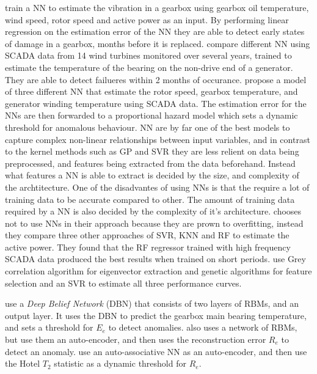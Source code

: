 \textcite{ANN_damage_detection_gearbox_wt} train a NN to estimate the vibration in a gearbox using gearbox oil temperature, wind speed, rotor speed and active power as an input. By performing linear regression on the estimation error of the NN they are able to detect early states of damage in a gearbox, months before it is replaced. \textcite{detecting_malfunctions_wt_generator_bearings_generic_vs_specific_models} compare different NN using SCADA data from 14 wind turbines monitored over several years, trained to estimate the temperature of the bearing on the non-drive end of a generator. They are able to detect failueres within 2 months of occurance. \textcite{health_cond_model_nn_proportional_hazard_models} propose a model of three different NN that estimate the rotor speed, gearbox temperature, and generator winding temperature using SCADA data. The estimation error for the NNs are then forwarded to a proportional hazard model which sets a dynamic threshold for anomalous behaviour. NN are by far one of the best models to capture complex non-linear relationships between input variables, and in contrast to the kernel methods such as GP and SVR they are less relient on data being preprocessed, and features being extracted from the data beforehand. Instead what features a NN is able to extract is decided by the size, and complexity of the archtitecture. One of the disadvantes of using NNs is that the require a lot of training data to be accurate compared to other. The amount of training data required by a NN is also decided by the complexity of it's architecture. \textcite{high_freq_scada_perf_monit_sensitivity} chooses not to use NNs in their approach because they are prown to overfitting, instead they compare three other approaches of SVR, KNN and RF to estimate the active power. They found that the RF regressor trained with high frequency SCADA data produced the best results when trained on short periods. \textcite{abnormal_detection_scada_data_mining} use Grey correlation algorithm for eigenvector extraction and genetic algorithms for feature selection and an SVR to estimate all three performance curves. \bigskip

\textcite{DBN_chicken_swarm_optim} use a \textit{Deep Belief Network} (DBN) that consists of two layers of RBMs, and an output layer. It uses the DBN to predict the gearbox main bearing temperature, and sets a threshold for $E_e$ to detect anomalies. \textcite{AD_and_fault_analysis_wt_DAE} also uses a network of RBMs, but use them an auto-encoder, and then uses the reconstruction error $R_e$ to detect an anomaly. \textcite{auto_associative_nn_wt_fault_detection} use an auto-associative NN as an auto-encoder, and then use the Hotel $T_2$ statistic as a dynamic threshold for $R_e$.

